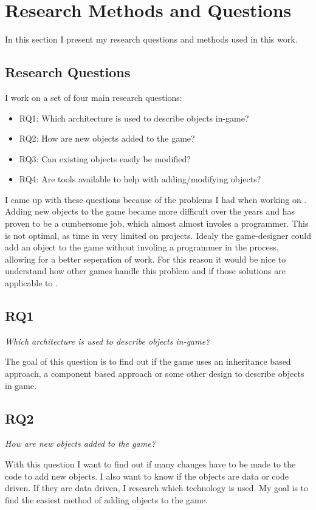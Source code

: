\section{Research Methods and Questions}
In this section I present my research questions and methods used in this work. 

\subsection{Research Questions}
I work on a set of four main research questions:
\begin{itemize}
	\item RQ1: Which architecture is used to describe objects in-game?
	\item RQ2: How are new objects added to the game?
	\item RQ3: Can existing objects easily be modified?
	\item RQ4: Are tools available to help with adding/modifying objects?
\end{itemize}

I came up with these questions because of the problems I had when working on \UH{}. Adding new objects to the game
became more difficult over the years and has proven to be a cumbersome job, which almost almost involes a programmer.
This is not optimal, as time in very limited on \OS{} projects. Idealy the game-designer could add an object to the game
without involing a programmer in the process, allowing for a better seperation of work.
For this reason it would be nice to understand how other \OS{} games handle this problem and if those solutions are
applicable to \UH{}.

\subsection{RQ1}
\textit{Which architecture is used to describe objects in-game?}

The goal of this question is to find out if the game uses an inheritance based approach, a component based approach or
some other design to describe objects in game. 

\subsection{RQ2}
\textit{How are new objects added to the game?}

With this question I want to find out if many changes have to be made to the code to add new objects. I also want
to know if the objects are data or code driven. If they are data driven, I research which technology is used. My goal
is to find the easiest method of adding objects to the game.

